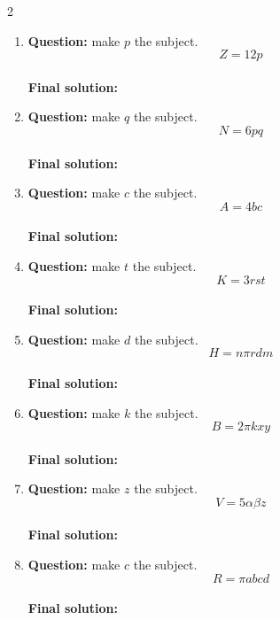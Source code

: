 \documentclass[11pt]{article}
\begin{document}
\begin{multicols}{2}
\begin{enumerate}[leftmargin=*, itemsep=10pt]
\newpage
\item \textbf{Question:} make \( p \) the subject.
\[
Z=12p
\] \\[4cm]
\textbf{Final solution:}\\[1.5cm]

\item \textbf{Question:} make \( q \) the subject.
\[
N=6pq
\] \\[4cm]
\textbf{Final solution:}\\[1.5cm]

\item \textbf{Question:} make \( c \) the subject.
\[
A=4bc
\] \\[4cm]
\textbf{Final solution:}\\[1.5cm]

\item \textbf{Question:} make \( t \) the subject.
\[
K=3rst
\] \\[4cm]
\textbf{Final solution:}\\[1.5cm]

\item \textbf{Question:} make \( d \) the subject.
\[
H=n\pi rdm
\] \\[4cm]
\textbf{Final solution:}\\[1.5cm]

\item \textbf{Question:} make \( k \) the subject.
\[
B=2\pi kxy
\] \\[4cm]
\textbf{Final solution:}\\[1.5cm]

\newpage
\item \textbf{Question:} make \( z \) the subject.
\[
V=5\alpha\beta z
\] \\[4cm]
\textbf{Final solution:}\\[1.5cm]

\item \textbf{Question:} make \( c \) the subject.
\[
R=\pi abcd
\] \\[4cm]
\textbf{Final solution:}\\[1.5cm]


\end{enumerate}
\end{multicols}
\end{document}
